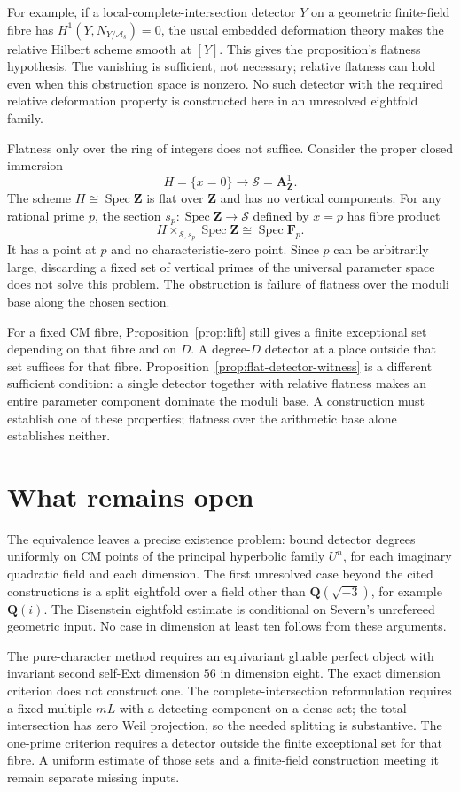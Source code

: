 \documentclass[11pt]{article}
\theoremstyle{definition}
\theoremstyle{remark}
\newcommand{\Q}{\mathbf Q}
\newcommand{\Z}{\mathbf Z}
\newcommand{\Spec}{\operatorname{Spec}}
\begin{document}
For example, if a local-complete-intersection detector $Y$ on a geometric finite-field fibre has $H^1(Y,N_{Y/\mathcal A_s})=0$, the usual embedded deformation theory makes the relative Hilbert scheme smooth at $[Y]$. This gives the proposition's flatness hypothesis. The vanishing is sufficient, not necessary; relative flatness can hold even when this obstruction space is nonzero. No such detector with the required relative deformation property is constructed here in an unresolved eightfold family.

Flatness only over the ring of integers does not suffice. Consider the proper closed immersion
\[
 H=\{x=0\}\longrightarrow\mathcal S=\mathbf A^1_\Z.
\]
The scheme $H\cong\Spec\Z$ is flat over $\Z$ and has no vertical components. For any rational prime $p$, the section $s_p:\Spec\Z\to\mathcal S$ defined by $x=p$ has fibre product
\[
 H\times_{\mathcal S,s_p}\Spec\Z\cong\Spec\mathbf F_p.
\]
It has a point at $p$ and no characteristic-zero point. Since $p$ can be arbitrarily large, discarding a fixed set of vertical primes of the universal parameter space does not solve this problem. The obstruction is failure of flatness over the moduli base along the chosen section.

For a fixed CM fibre, Proposition~\ref{prop:lift} still gives a finite exceptional set depending on that fibre and on $D$. A degree-$D$ detector at a place outside that set suffices for that fibre. Proposition~\ref{prop:flat-detector-witness} is a different sufficient condition: a single detector together with relative flatness makes an entire parameter component dominate the moduli base. A construction must establish one of these properties; flatness over the arithmetic base alone establishes neither.

\section{What remains open}\label{sec:open}
The equivalence leaves a precise existence problem: bound detector
degrees uniformly on CM points of the principal hyperbolic family
$U^n$, for each imaginary quadratic field and each dimension.
The first unresolved case beyond the cited constructions is a split
eightfold over a field other than $\Q(\sqrt{-3})$, for example $\Q(i)$.
The Eisenstein eightfold estimate is conditional on Severn's
unrefereed geometric input. No case in dimension at least ten follows
from these arguments.

The pure-character method requires an equivariant gluable perfect
object with invariant second self-Ext dimension $56$ in dimension
eight. The exact dimension criterion does not construct one. The
complete-intersection reformulation requires a fixed multiple $mL$
with a detecting component on a dense set; the total intersection
has zero Weil projection, so the needed splitting is substantive.
The one-prime criterion requires a detector outside the finite
exceptional set for that fibre. A uniform estimate of those sets and
a finite-field construction meeting it remain separate missing inputs.
\end{document}

